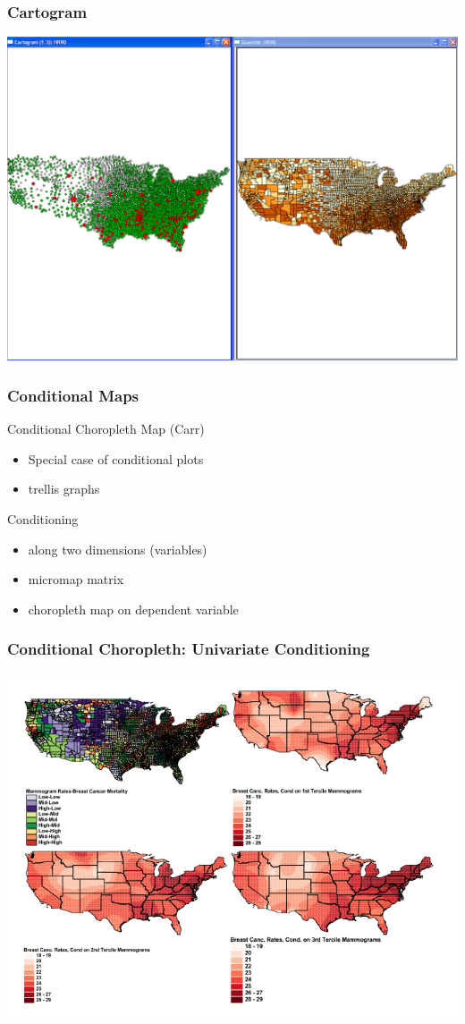 \documentclass[nototal,handout]{beamer}
\begin{document}
\begin{frame}
	\frametitle{Cartogram}
 \begin{center}
 \includegraphics[width=.85\linewidth]{cartogram.png}
  \end{center}
 \end{frame} 

\begin{frame}
	\frametitle{Conditional Maps}
 
\begin{block}{Conditional Choropleth Map (Carr)}
 \begin{itemize}
 \item  Special case of conditional plots
 \item  trellis graphs	
 \end{itemize}
 \end{block} 
\begin{block}{Conditioning}
 \begin{itemize}
 \item  along two dimensions (variables)
 \item  micromap matrix
 \item  choropleth map on dependent variable
 \end{itemize}
 \end{block} \end{frame} 

\begin{frame}
	\frametitle{Conditional Choropleth: Univariate Conditioning}
 \begin{center}
 \includegraphics[width=.85\linewidth]{conditionalchoropleth.png}
  \end{center}
 \end{frame} 
\end{document}
